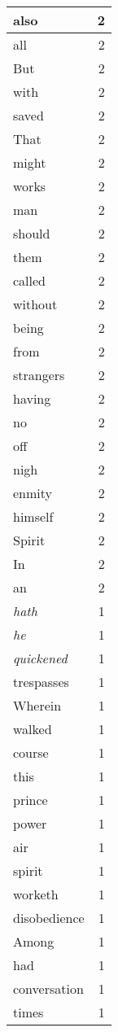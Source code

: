 \begin{center}
\begin{longtable}{l|r}
also & 2\\ \hline 
all & 2\\ \hline 
But & 2\\ \hline 
with & 2\\ \hline 
saved & 2\\ \hline 
That & 2\\ \hline 
might & 2\\ \hline 
works & 2\\ \hline 
man & 2\\ \hline 
should & 2\\ \hline 
them & 2\\ \hline 
called & 2\\ \hline 
without & 2\\ \hline 
being & 2\\ \hline 
from & 2\\ \hline 
strangers & 2\\ \hline 
having & 2\\ \hline 
no & 2\\ \hline 
off & 2\\ \hline 
nigh & 2\\ \hline 
enmity & 2\\ \hline 
himself & 2\\ \hline 
Spirit & 2\\ \hline 
In & 2\\ \hline 
an & 2\\ \hline 
\emph{hath} & 1\\ \hline 
\emph{he} & 1\\ \hline 
\emph{quickened} & 1\\ \hline 
trespasses & 1\\ \hline 
Wherein & 1\\ \hline 
walked & 1\\ \hline 
course & 1\\ \hline 
this & 1\\ \hline 
prince & 1\\ \hline 
power & 1\\ \hline 
air & 1\\ \hline 
spirit & 1\\ \hline 
worketh & 1\\ \hline 
disobedience & 1\\ \hline 
Among & 1\\ \hline 
had & 1\\ \hline 
conversation & 1\\ \hline 
times & 1\\ \hline 

\end{longtable}
\end{center}
